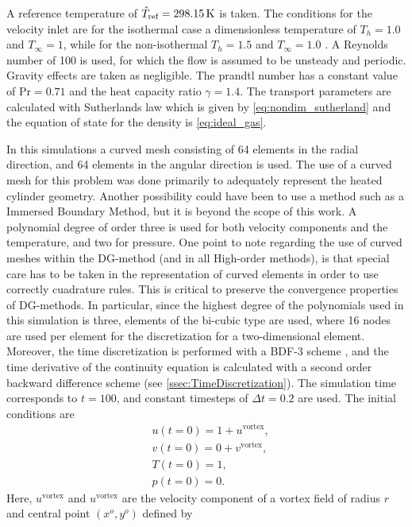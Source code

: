 A reference temperature of $\hat T_{\text{ref}} = \SI{298.15}{\kelvin}$ is taken. The conditions for the velocity inlet are for the isothermal case a dimensionless temperature of $T_h = 1.0$ and $T_\infty = 1$, while for the non-isothermal $T_h = 1.5$ and $T_\infty = 1.0$ . A Reynolds number of 100 is used, for which the flow is assumed to be unsteady and periodic. Gravity effects are taken as negligible. The prandtl number has a constant value of $\text{Pr} = 0.71$ and the heat capacity ratio $\gamma = 1.4$. The transport parameters are calculated with Sutherlands law which is given by \cref{eq:nondim_sutherland} and the equation of state for the density is \cref{eq:ideal_gas}.

In this simulations a curved mesh consisting of 64 elements in the radial direction, and 64 elements in the angular direction is used. The use of a curved mesh for this problem was done primarily to adequately represent the heated cylinder geometry. Another possibility could have been to use a method such as a Immersed Boundary Method, but it is beyond the scope of this work. A polynomial degree of order three is used for both velocity components and the temperature, and two for pressure. One point to note regarding the use of curved meshes within the DG-method (and in all High-order methods), is that special care has to be taken in the representation of curved elements \citep{bassiHighOrderAccurateDiscontinuous1997} in order to use correctly cuadrature rules. This is critical to preserve the convergence properties of DG-methods. In particular, since the highest degree of the polynomials used in this simulation is three, elements of the bi-cubic type are used, where 16 nodes are used per element for the discretization for a two-dimensional element. Moreover, the time discretization is performed with a BDF-3 scheme , and the time derivative of the continuity equation is calculated with a second order backward difference scheme (see \cref{ssec:TimeDiscretization}). The simulation time corresponds to $t= 100$, and constant timesteps of $\Delta t = 0.2$ are used. The initial conditions are
\begin{subequations} 
\begin{align}
&u(t=0) = 1 + u^{\text{vortex}},  \\
&v(t=0) = 0 + v^{\text{vortex}},  \\
&T(t=0) = 1,\\
&p(t=0) = 0.
\end{align}
\end{subequations}
Here, $u^{\text{vortex}}$ and $u^{\text{vortex}}$ are the velocity component of a vortex field of radius $r$ and central point $(x^o,y^o)$ defined by 
